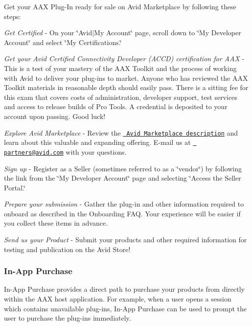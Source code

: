  Get your A\+AX Plug-\/\+In ready for sale on Avid Marketplace by following these steps\+: 
\begin{DoxyItemize}
\item {\itshape Get Certified} -\/ On your \char`\"{}\+Avid$\vert$\+My Account\char`\"{} page, scroll down to \char`\"{}\+My Developer Account\char`\"{} and select \char`\"{}\+My Certifications.\char`\"{}  
\item {\itshape Get your Avid Certified Connectivity Developer (A\+C\+CD) certification for A\+AX} -\/ This is a test of your mastery of the A\+AX Toolkit and the process of working with Avid to deliver your plug-\/ins to market. Anyone who has reviewed the A\+AX Toolkit materials in reasonable depth should easily pass. There is a sitting fee for this exam that covers costs of administration, developer support, test services and access to release builds of Pro Tools. A credential is deposited to your account upon passing. Good luck!  
\item {\itshape Explore Avid Marketplace} -\/ Review the \href{http://www.avid.com/alliance-partner-program/about-marketplace}{\texttt{ Avid Marketplace description}} and learn about this valuable and expanding offering. E-\/mail us at \href{mailto:partners@avid.com}{\texttt{ partners@avid.\+com}} with your questions.  
\item {\itshape Sign up} -\/ Register as a Seller (sometimes referred to as a \char`\"{}vendor\char`\"{}) by following the link from the \char`\"{}\+My Developer Account\char`\"{} page and selecting \char`\"{}\+Access the Seller Portal.\char`\"{}  
\item {\itshape Prepare your submission} -\/ Gather the plug-\/in and other information required to onboard as described in the Onboarding F\+AQ. Your experience will be easier if you collect these items in advance.  
\item {\itshape Send us your Product} -\/ Submit your products and other required information for testing and publication on the Avid Store!  
\end{DoxyItemize}

\hypertarget{a00843_aax_distributing_selling_inapppurchase}{}\subsubsection{In-\/\+App Purchase}\label{a00843_aax_distributing_selling_inapppurchase}
 In-\/\+App Purchase provides a direct path to purchase your products from directly within the A\+AX host application. For example, when a user opens a session which contains unavailable plug-\/ins, In-\/\+App Purchase can be used to prompt the user to purchase the plug-\/ins immediately.


